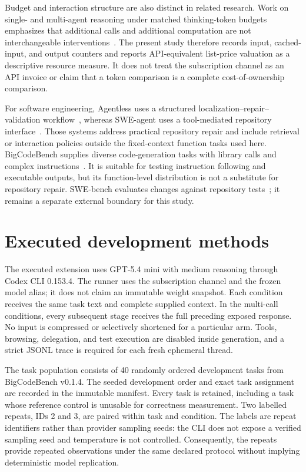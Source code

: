 Budget and interaction structure are also distinct in related research. Work on single- and multi-agent reasoning under matched thinking-token budgets emphasizes that additional calls and additional computation are not interchangeable interventions~\cite{tran2026budget}. The present study therefore records input, cached-input, and output counters and reports API-equivalent list-price valuation as a descriptive resource measure. It does not treat the subscription channel as an API invoice or claim that a token comparison is a complete cost-of-ownership comparison.

For software engineering, Agentless uses a structured localization--repair--validation workflow~\cite{xia2024agentless}, whereas SWE-agent uses a tool-mediated repository interface~\cite{yang2024sweagent}. Those systems address practical repository repair and include retrieval or interaction policies outside the fixed-context function tasks used here. BigCodeBench supplies diverse code-generation tasks with library calls and complex instructions~\cite{zhuo2024bigcodebench}. It is suitable for testing instruction following and executable outputs, but its function-level distribution is not a substitute for repository repair. SWE-bench evaluates changes against repository tests~\cite{jimenez2023swebench,swebenchdocs2026}; it remains a separate external boundary for this study.

\section{Executed development methods}
\label{sec:dev40-methods}

The executed extension uses GPT-5.4 mini with medium reasoning through Codex CLI 0.153.4. The runner uses the subscription channel and the frozen model alias; it does not claim an immutable weight snapshot. Each condition receives the same task text and complete supplied context. In the multi-call conditions, every subsequent stage receives the full preceding exposed response. No input is compressed or selectively shortened for a particular arm. Tools, browsing, delegation, and test execution are disabled inside generation, and a strict JSONL trace is required for each fresh ephemeral thread.

The task population consists of 40 randomly ordered development tasks from BigCodeBench v0.1.4. The seeded development order and exact task assignment are recorded in the immutable manifest. Every task is retained, including a task whose reference control is unusable for correctness measurement. Two labelled repeats, IDs 2 and 3, are paired within task and condition. The labels are repeat identifiers rather than provider sampling seeds: the CLI does not expose a verified sampling seed and temperature is not controlled. Consequently, the repeats provide repeated observations under the same declared protocol without implying deterministic model replication.

